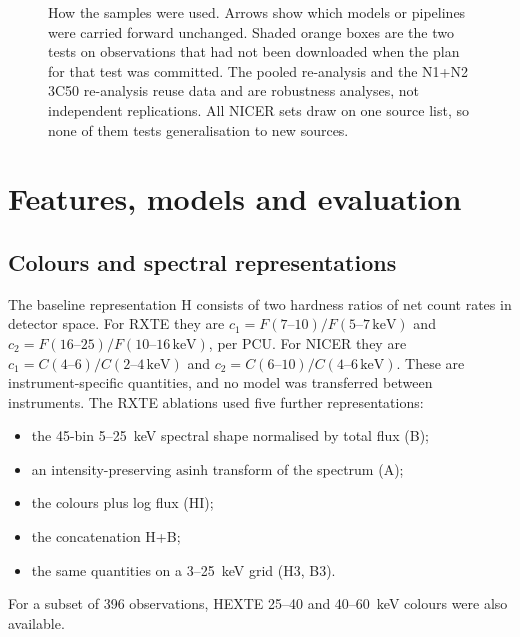 \documentclass[11pt,a4paper]{article}
\newcommand{\Hcol}{\textsf{H}}
\begin{document}
\begin{figure}[t]
\caption{How the samples were used. Arrows show which models or pipelines were carried forward unchanged. Shaded orange
boxes are the two tests on observations that had not been downloaded when the plan for that test was committed. The
pooled re-analysis and the N1+N2 3C50 re-analysis reuse data and are robustness analyses, not independent replications.
All NICER sets draw on one source list, so none of them tests generalisation to new sources.}\label{fig:design}
\end{figure}

\section{Features, models and evaluation}\label{sec:methods}

\subsection{Colours and spectral representations}\label{sec:colours}
The baseline representation \Hcol{} consists of two hardness ratios of net count rates in detector space. For RXTE they
are $c_1=F(7\text{--}10)/F(5\text{--}7\,\mathrm{keV})$ and $c_2=F(16\text{--}25)/F(10\text{--}16\,\mathrm{keV})$, per
PCU. For NICER they are $c_1=C(4\text{--}6)/C(2\text{--}4\,\mathrm{keV})$ and $c_2=C(6\text{--}10)/C(4\text{--}6\,
\mathrm{keV})$. These are instrument-specific quantities, and no model was transferred between instruments. The RXTE
ablations used five further representations:
\begin{itemize}\setlength\itemsep{1pt}
\item the 45-bin 5--25~keV spectral shape normalised by total flux (B);
\item an intensity-preserving $\mathrm{asinh}$ transform of the spectrum (A);
\item the colours plus log flux (HI);
\item the concatenation \Hcol{}+B;
\item the same quantities on a 3--25~keV grid (H3, B3).
\end{itemize}
For a subset of 396 observations, HEXTE 25--40 and 40--60~keV colours were also available.
\end{document}
